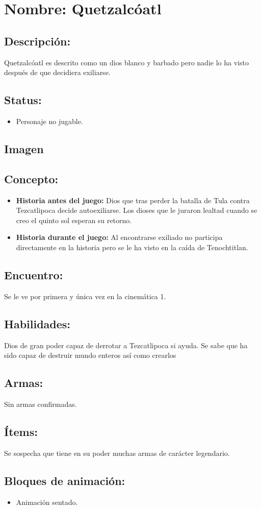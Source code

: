 \section{Nombre: Quetzalcóatl}  \label{per:quetzalcoatl}
\subsection{Descripción:}
Quetzalcóatl es descrito como un dios blanco y barbado pero nadie lo ha visto después de que decidiera exiliarse.
\subsection{Status:}
\begin{itemize}
		\item Personaje no jugable.
	\end{itemize}
\subsection{Imagen}
\subsection{Concepto:}
\begin{itemize}
	\item \textbf{Historia antes del juego:}
	Dios que tras perder la batalla de Tula contra Tezcatlipoca decide autoexiliarse. Los dioses que le juraron lealtad cuando se creo el quinto sol esperan su retorno.
	\item \textbf{Historia durante el juego:}
	Al encontrarse exiliado no participa directamente en la historia pero se le ha visto en la caída de Tenochtitlan.
\end{itemize} 
\subsection{Encuentro:}
Se le ve por primera y única vez en la cinemática 1.
\subsection{Habilidades:}
Dios de gran poder capaz de derrotar a Tezcatlipoca si ayuda. Se sabe que ha sido capaz de destruir mundo enteros así como crearlos
\subsection{Armas:}
Sin armas confirmadas.
\subsection{Ítems:}
Se sospecha que tiene en su poder muchas armas de carácter legendario.
\subsection{Bloques de animación:}
	\begin{itemize}
		\item Animación sentado.
	\end{itemize}